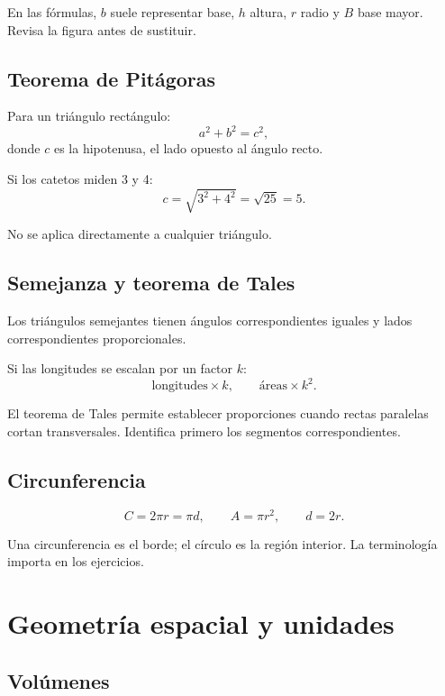 \documentclass[10pt,oneside]{book}
\begin{document}
	En las fórmulas, $b$ suele representar base, $h$ altura,
	$r$ radio y $B$ base mayor. Revisa la figura antes de sustituir.
	
	\section{Teorema de Pitágoras}
	
	Para un triángulo rectángulo:
	\[
	a^2+b^2=c^2,
	\]
	donde $c$ es la hipotenusa, el lado opuesto al ángulo recto.
	
	\begin{ejemplo}
		Si los catetos miden 3 y 4:
		\[
		c=\sqrt{3^2+4^2}=\sqrt{25}=5.
		\]
	\end{ejemplo}
	
	No se aplica directamente a cualquier triángulo.
	
	\section{Semejanza y teorema de Tales}
	
	Los triángulos semejantes tienen ángulos correspondientes
	iguales y lados correspondientes proporcionales.
	
	Si las longitudes se escalan por un factor $k$:
	\[
	\text{longitudes}\times k,\qquad
	\text{áreas}\times k^2.
	\]
	
	El teorema de Tales permite establecer proporciones cuando
	rectas paralelas cortan transversales. Identifica primero
	los segmentos correspondientes.
	
	\section{Circunferencia}
	
	\[
	C=2\pi r=\pi d,\qquad A=\pi r^2,\qquad d=2r.
	\]
	
	Una circunferencia es el borde; el círculo es la región interior.
	La terminología importa en los ejercicios.
	
	\chapter{Geometría espacial y unidades}
	
	\section{Volúmenes}
	
\end{document}
